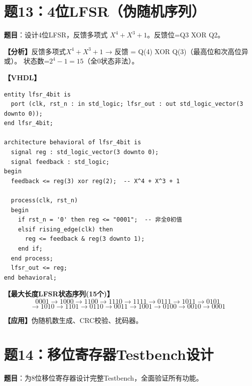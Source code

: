 \section{题13：4位LFSR（伪随机序列）}

\textbf{题目}：设计4位LFSR，反馈多项式 $X^4+X^3+1$。反馈位=Q3 XOR Q2。

\begin{solution}[完整解答]

\textbf{【分析】}反馈多项式$X^4+X^3+1$ → 反馈 = Q(4) XOR Q(3)（最高位和次高位异或）。
状态数=$2^4-1=15$（全0状态非法）。

\textbf{【VHDL】}
\begin{lstlisting}
entity lfsr_4bit is
  port (clk, rst_n : in std_logic; lfsr_out : out std_logic_vector(3 downto 0));
end lfsr_4bit;

architecture behavioral of lfsr_4bit is
  signal reg : std_logic_vector(3 downto 0);
  signal feedback : std_logic;
begin
  feedback <= reg(3) xor reg(2);  -- X^4 + X^3 + 1

  process(clk, rst_n)
  begin
    if rst_n = '0' then reg <= "0001";  -- 非全0初值
    elsif rising_edge(clk) then
      reg <= feedback & reg(3 downto 1);
    end if;
  end process;
  lfsr_out <= reg;
end behavioral;
\end{lstlisting}

\textbf{【最大长度LFSR状态序列(15个)】}
$$0001\to1000\to1100\to1110\to1111\to0111\to1011\to0101$$
$$\to1010\to1101\to0110\to0011\to1001\to0100\to0010\to0001$$

\textbf{【应用】}伪随机数生成、CRC校验、扰码器。

\end{solution}


\section{题14：移位寄存器Testbench设计}

\textbf{题目}：为8位移位寄存器设计完整Testbench，全面验证所有功能。


